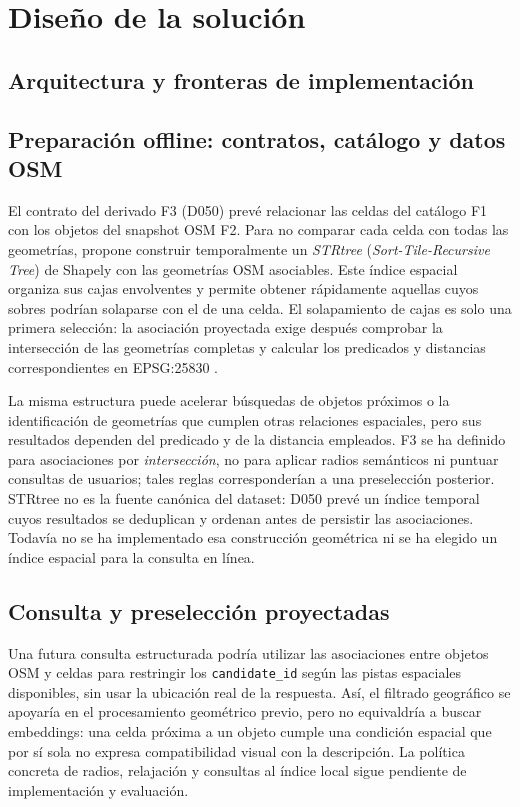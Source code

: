 \chapter{Diseño de la solución}
\label{cap:diseno}

\section{Arquitectura y fronteras de implementación}
\label{sec:arquitectura}

\section{Preparación offline: contratos, catálogo y datos OSM}
\label{sec:diseno-offline}
El contrato del derivado F3 (D050) prevé relacionar las celdas del catálogo F1 con los objetos del snapshot OSM F2. Para no comparar cada celda con todas las geometrías, propone construir temporalmente un \emph{STRtree} (\emph{Sort-Tile-Recursive Tree}) de Shapely con las geometrías OSM asociables. Este índice espacial organiza sus cajas envolventes y permite obtener rápidamente aquellas cuyos sobres podrían solaparse con el de una celda. El solapamiento de cajas es solo una primera selección: la asociación proyectada exige después comprobar la intersección de las geometrías completas y calcular los predicados y distancias correspondientes en EPSG:25830 \cite{shapely:strtree}.

La misma estructura puede acelerar búsquedas de objetos próximos o la identificación de geometrías que cumplen otras relaciones espaciales, pero sus resultados dependen del predicado y de la distancia empleados. F3 se ha definido para asociaciones por \emph{intersección}, no para aplicar radios semánticos ni puntuar consultas de usuarios; tales reglas corresponderían a una preselección posterior. STRtree no es la fuente canónica del dataset: D050 prevé un índice temporal cuyos resultados se deduplican y ordenan antes de persistir las asociaciones. Todavía no se ha implementado esa construcción geométrica ni se ha elegido un índice espacial para la consulta en línea.

\section{Consulta y preselección proyectadas}
\label{sec:consulta}
Una futura consulta estructurada podría utilizar las asociaciones entre objetos OSM y celdas para restringir los \texttt{candidate\_id} según las pistas espaciales disponibles, sin usar la ubicación real de la respuesta. Así, el filtrado geográfico se apoyaría en el procesamiento geométrico previo, pero no equivaldría a buscar embeddings: una celda próxima a un objeto cumple una condición espacial que por sí sola no expresa compatibilidad visual con la descripción. La política concreta de radios, relajación y consultas al índice local sigue pendiente de implementación y evaluación.

